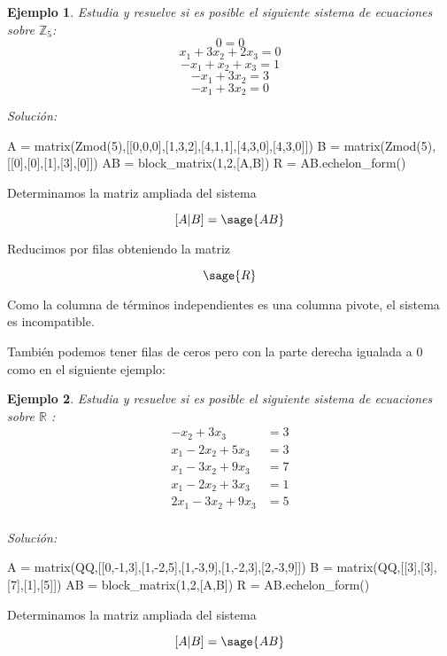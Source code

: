 \documentclass{amsart}
\newtheorem{ejem}{Ejemplo}
\def\r{\mathbb{R}}
\def\z{\mathbb{Z}}
\begin{document}
\begin{ejem} Estudia y resuelve si es posible el siguiente sistema de ecuaciones sobre $\z _5$:
\[ 0 = 0 \]
\[ x_{1} + 3 x_{2} + 2 x_{3} = 0 \]
\[ -x_{1} + x_{2} + x_{3} = 1 \]
\[ -x_{1} + 3 x_{2} = 3 \]
\[ -x_{1} + 3 x_{2} = 0 \]
\end{ejem}

{\it Soluci\'on: }

\begin{sageblock}
A = matrix(Zmod(5),[[0,0,0],[1,3,2],[4,1,1],[4,3,0],[4,3,0]])
B = matrix(Zmod(5),[[0],[0],[1],[3],[0]])
AB = block_matrix(1,2,[A,B])
R = AB.echelon_form()
\end{sageblock}

Determinamos la matriz ampliada del sistema 

\[[A|B] = \sage{AB} \]

Reducimos por filas obteniendo la matriz

\[ \sage{R} \]

Como la columna de t\'erminos independientes es una columna pivote, el sistema es incompatible.


También podemos tener filas de ceros pero con la parte derecha igualada
a $0$ como en el siguiente ejemplo:

\begin{ejem} Estudia y resuelve si es posible el siguiente sistema de ecuaciones sobre $\r $ :
\begin{align*}
-x_{2} + 3 x_{3} &= 3 \\
x_{1} - 2 x_{2} + 5 x_{3} &= 3 \\
x_{1} - 3 x_{2} + 9 x_{3} &= 7 \\
x_{1} - 2 x_{2} + 3 x_{3} &= 1 \\
2 x_{1} - 3 x_{2} + 9 x_{3} &= 5 \\
\end{align*}
\end{ejem}

{\it Soluci\'on:}

\begin{sageblock}
A = matrix(QQ,[[0,-1,3],[1,-2,5],[1,-3,9],[1,-2,3],[2,-3,9]])
B = matrix(QQ,[[3],[3],[7],[1],[5]])
AB = block_matrix(1,2,[A,B])
R = AB.echelon_form()
\end{sageblock}

Determinamos la matriz ampliada del sistema 

\[[A|B] = \sage{AB} \]
\end{document}
